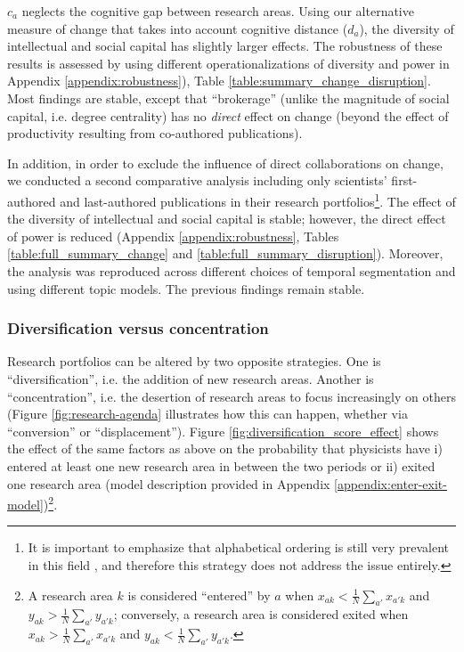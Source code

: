 \documentclass{article}
\begin{document}
$c_a$ neglects the cognitive gap between research areas. Using our alternative measure of change that takes into account cognitive distance ($d_a$),  the diversity of intellectual and social capital has slightly larger effects. The robustness of these results is assessed by using different operationalizations of diversity and power in Appendix \ref{appendix:robustness}), Table \ref{table:summary_change_disruption}. Most findings are stable, except that ``brokerage'' (unlike the magnitude of social capital, i.e. degree centrality) has no \textit{direct} effect on change (beyond the effect of productivity resulting from co-authored publications). 

In addition, in order to exclude the influence of direct collaborations on change, we conducted a second comparative analysis including only scientists' first-authored and last-authored publications in their research portfolios\footnote{It is important to emphasize that alphabetical ordering is still very prevalent in this field \citep{waltman2012empirical}, and therefore this strategy does not address the issue entirely.}. The effect of the diversity of intellectual and social capital is stable; however, the direct effect of power is reduced (Appendix \ref{appendix:robustness}, Tables \ref{table:full_summary_change} and \ref{table:full_summary_disruption}). Moreover, the analysis was reproduced across different choices of temporal segmentation and using different topic models. The previous findings remain stable.

\subsubsection{Diversification versus concentration}

Research portfolios can be altered by two opposite strategies. One is ``diversification'', i.e. the addition of new research areas. Another is ``concentration'', i.e. the desertion of research areas to focus increasingly on others (Figure \ref{fig:research-agenda} illustrates how this can happen, whether via ``conversion'' or ``displacement''). Figure \ref{fig:diversification_score_effect} shows the effect of the same factors as above on the probability that physicists have i) entered at least one new research area in between the two periods or ii) exited one research area (model description provided in Appendix \ref{appendix:enter-exit-model})\footnote{A research area $k$ is considered ``entered'' by $a$ when $x_{ak}<\frac{1}{N}\sum_{a'}x_{a'k}$ and $y_{ak}>\frac{1}{N}\sum_{a'}y_{a'k}$; conversely, a research area is considered exited when $x_{ak}>\frac{1}{N}\sum_{a'}x_{a'k}$ and $y_{ak}<\frac{1}{N}\sum_{a'}y_{a'k}$.}.
\end{document}
